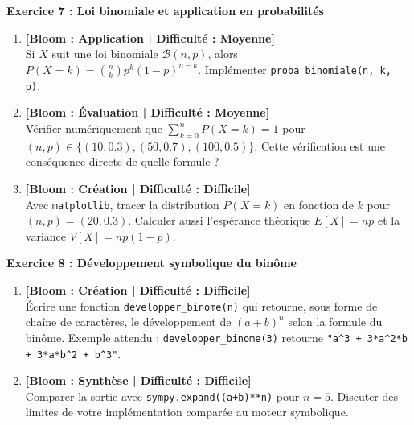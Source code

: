 \documentclass[12pt,a4paper]{report}
\begin{document}
\noindent\textbf{Exercice 7 : Loi binomiale et application en probabilités}
\begin{enumerate}
    \item \textbf{[Bloom : Application | Difficulté : Moyenne]} \\
    Si $X$ suit une loi binomiale $\mathcal{B}(n, p)$, alors $P(X = k) = \binom{n}{k} p^k (1-p)^{n-k}$. Implémenter \texttt{proba\_binomiale(n, k, p)}.
    \item \textbf{[Bloom : Évaluation | Difficulté : Moyenne]} \\
    Vérifier numériquement que $\sum_{k=0}^{n} P(X = k) = 1$ pour $(n, p) \in \{(10, 0.3), (50, 0.7), (100, 0.5)\}$. Cette vérification est une conséquence directe de quelle formule ?
    \item \textbf{[Bloom : Création | Difficulté : Difficile]} \\
    Avec \texttt{matplotlib}, tracer la distribution $P(X = k)$ en fonction de $k$ pour $(n, p) = (20, 0.3)$. Calculer aussi l'espérance théorique $E[X] = np$ et la variance $V[X] = np(1-p)$.
\end{enumerate}

\vspace{0.3cm}

\noindent\textbf{Exercice 8 : Développement symbolique du binôme}
\begin{enumerate}
    \item \textbf{[Bloom : Création | Difficulté : Difficile]} \\
    Écrire une fonction \texttt{developper\_binome(n)} qui retourne, sous forme de chaîne de caractères, le développement de $(a + b)^n$ selon la formule du binôme. Exemple attendu :
    \texttt{developper\_binome(3)} retourne \texttt{"a\^{}3 + 3*a\^{}2*b + 3*a*b\^{}2 + b\^{}3"}.
    \item \textbf{[Bloom : Synthèse | Difficulté : Difficile]} \\
    Comparer la sortie avec \texttt{sympy.expand((a+b)**n)} pour $n = 5$. Discuter des limites de votre implémentation comparée au moteur symbolique.
\end{enumerate}
\end{document}
